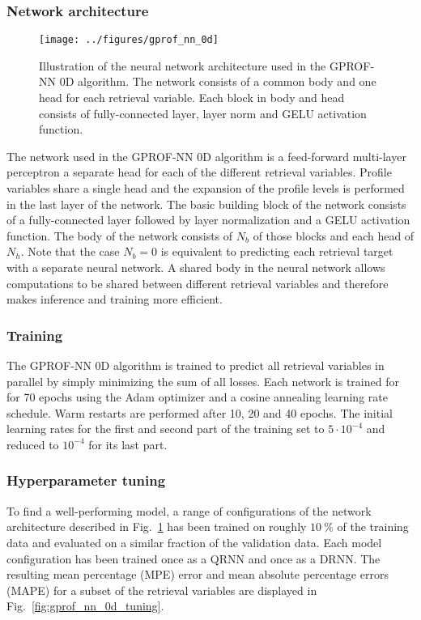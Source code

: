 \documentclass[a4paper,11pt,bibtotoc]{scrartcl}
\begin{document}
\subsubsection{Network architecture}

\begin{figure}[hbpt]
  \centering
    \texttt{[image: ../figures/gprof\_nn\_0d]}
    \caption{Illustration of the neural network architecture used in the
      GPROF-NN 0D algorithm. The network consists of a common body and
      one head for each retrieval variable. Each block in body and head
      consists of fully-connected layer, layer norm and GELU activation function.
    }
  \label{fig:gprof_nn_0d}
\end{figure}

The network used in the GPROF-NN 0D algorithm is a feed-forward multi-layer
perceptron a  separate head for each of the different retrieval variables.
Profile variables share a single head and the expansion of the profile levels
is performed in the last layer of the network. The basic building block of
the network consists of a fully-connected layer followed by layer normalization
and a GELU activation function. The body of the network consists of
$N_b$ of those blocks and each head of $N_h$. Note that the case $N_b = 0$ is
equivalent to predicting each retrieval target with a separate neural network.
A shared body in the neural network allows computations to be shared between
different retrieval variables and therefore makes inference and training more
efficient.

\subsubsection{Training}

The GPROF-NN 0D algorithm is trained to predict all retrieval variables in
parallel by simply minimizing the sum of all losses. Each network is trained for
for 70 epochs using the Adam optimizer and a cosine annealing learning rate
schedule. Warm restarts are performed after 10, 20 and 40 epochs. The initial
learning rates for the first and second part of the training set to $5\cdot
10^{-4}$ and reduced to $10^{-4}$ for its last part.

\subsubsection{Hyperparameter tuning}

To find a well-performing model, a range of configurations of the network
architecture described in Fig.~\ref{fig:gprof_nn_0d} has been trained on roughly
$10\ \unit{\%}$ of the training data and evaluated on a similar fraction of the
validation data. Each model configuration has been trained once as a QRNN and
once as a DRNN. The resulting mean percentage (MPE) error and mean absolute
percentage errors (MAPE) for a subset of the retrieval variables are displayed
in Fig.~\ref{fig:gprof_nn_0d_tuning}.
\end{document}
